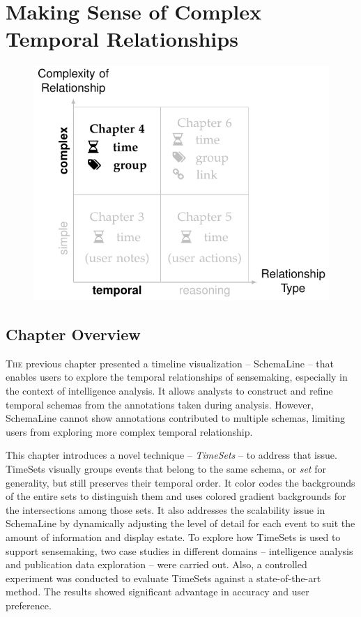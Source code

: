 \chapter{Making Sense of Complex Temporal Relationships}
\label{chap:timesets}

\graphicspath{{Chapter4/figures/}}

\vspace{.7in}

\begin{figure}[!h]
	\centering
	\includegraphics{work}
\end{figure}

\pagebreak

\section{Chapter Overview}
\lettrine{T}{he} previous chapter presented a timeline visualization -- SchemaLine -- that enables users to explore the temporal relationships of sensemaking, especially in the context of intelligence analysis. It allows analysts to construct and refine temporal schemas from the annotations taken during analysis. However, SchemaLine cannot show annotations contributed to multiple schemas, limiting users from exploring more complex temporal relationship.

This chapter introduces a novel technique -- \emph{TimeSets} -- to address that issue. TimeSets visually groups events that belong to the same schema, or \emph{set} for generality, but still preserves their temporal order. It color codes the backgrounds of the entire sets to distinguish them and uses colored gradient backgrounds for the intersections among those sets. It also addresses the scalability issue in SchemaLine by dynamically adjusting the level of detail for each event to suit the amount of information and display estate. To explore how TimeSets is used to support sensemaking, two case studies in different domains -- intelligence analysis and publication data exploration -- were carried out. Also, a controlled experiment was conducted to evaluate TimeSets against a state-of-the-art method. The results showed significant advantage in accuracy and user preference.

